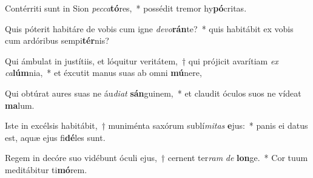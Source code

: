 \item Contérriti sunt in Sion \textit{pec}\textit{ca}\textbf{tó}res,~* possédit tremor hy\textbf{pó}critas.
\item Quis póterit habitáre de vobis cum igne \textit{de}\textit{vo}\textbf{rán}te?~* quis habitábit ex vobis cum ardóribus sempi\textbf{tér}nis?
\item Qui ámbulat in justítiis, et lóquitur veritátem,~† qui prójicit avarítiam \textit{ex} \textit{ca}\textbf{lúm}nia,~* et éxcutit manus suas ab omni \textbf{mú}nere,
\item Qui obtúrat aures suas ne áu\textit{di}\textit{at} \textbf{sán}guinem,~* et claudit óculos suos ne vídeat \textbf{ma}lum.
\item Iste in excélsis habitábit,~† muniménta saxórum sublí\textit{mi}\textit{tas} \textbf{e}jus:~* panis ei datus est, aquæ ejus fi\textbf{dé}les sunt.
\item Regem in decóre suo vidébunt óculi ejus,~† cernent ter\textit{ram} \textit{de} \textbf{lon}ge.~* Cor tuum meditábitur ti\textbf{mó}rem.
